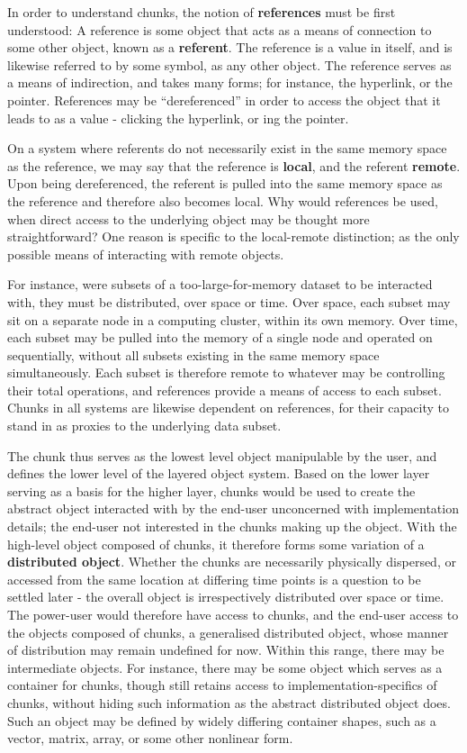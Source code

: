 In order to understand chunks, the notion of \textbf{references} must be first understood: A reference is some object that acts as a means of connection to some other object, known as a \textbf{referent}.
The reference is a value in itself, and is likewise referred to by some symbol, as any other object.
The reference serves as a means of indirection, and takes many forms; for instance, the hyperlink, or the pointer.
References may be ``dereferenced'' in order to access the object that it leads to as a value - clicking the hyperlink, or ing the pointer.

On a system where referents do not necessarily exist in the same memory space as the reference, we may say that the reference is \textbf{local}, and the referent \textbf{remote}.
Upon being dereferenced, the referent is pulled into the same memory space as the reference and therefore also becomes local.
Why would references be used, when direct access to the underlying object may be thought more straightforward?
One reason is specific to the local-remote distinction; as the only possible means of interacting with remote objects.

For instance, were subsets of a too-large-for-memory dataset to be interacted with, they must be distributed, over space or time.
Over space, each subset may sit on a separate node in a computing cluster, within its own memory.
Over time, each subset may be pulled into the memory of a single node and operated on sequentially, without all subsets existing in the same memory space simultaneously.
Each subset is therefore remote to whatever may be controlling their total operations, and references provide a means of access to each subset.
Chunks in all systems are likewise dependent on references, for their capacity to stand in as proxies to the underlying data subset.

The chunk thus serves as the lowest level object manipulable by the user, and defines the lower level of the layered object system.
Based on the lower layer serving as a basis for the higher layer, chunks would be used to create the abstract object interacted with by the end-user unconcerned with implementation details; the end-user not interested in the chunks making up the object.
With the high-level object composed of chunks, it therefore forms some variation of a \textbf{distributed object}.
Whether the chunks are necessarily physically dispersed, or accessed from the same location at differing time points is a question to be settled later - the overall object is irrespectively distributed over space or time.
The power-user would therefore have access to chunks, and the end-user access to the objects composed of chunks, a generalised distributed object, whose manner of distribution may remain undefined for now.
Within this range, there may be intermediate objects.
For instance, there may be some object which serves as a container for chunks, though still retains access to implementation-specifics of chunks, without hiding such information as the abstract distributed object does.
Such an object may be defined by widely differing container shapes, such as a vector, matrix, array, or some other nonlinear form.

